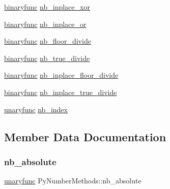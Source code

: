 \begin{DoxyCompactItemize}
\item 
\mbox{\hyperlink{_python27_2object_8h_a1a50b2d154f36acb9d215f2cdc1561a8}{binaryfunc}} \mbox{\hyperlink{struct_py_number_methods_a765b38e2d40ef62058dc8433fb35d2d8}{nb\+\_\+inplace\+\_\+xor}}
\item 
\mbox{\hyperlink{_python27_2object_8h_a1a50b2d154f36acb9d215f2cdc1561a8}{binaryfunc}} \mbox{\hyperlink{struct_py_number_methods_a3e01f63c2f42532862663e2d94f70833}{nb\+\_\+inplace\+\_\+or}}
\item 
\mbox{\hyperlink{_python27_2object_8h_a1a50b2d154f36acb9d215f2cdc1561a8}{binaryfunc}} \mbox{\hyperlink{struct_py_number_methods_a05f22c9ef56fb0c264dd1987975f6c0c}{nb\+\_\+floor\+\_\+divide}}
\item 
\mbox{\hyperlink{_python27_2object_8h_a1a50b2d154f36acb9d215f2cdc1561a8}{binaryfunc}} \mbox{\hyperlink{struct_py_number_methods_a7de1a2730c487e2dcce5babec5b24bed}{nb\+\_\+true\+\_\+divide}}
\item 
\mbox{\hyperlink{_python27_2object_8h_a1a50b2d154f36acb9d215f2cdc1561a8}{binaryfunc}} \mbox{\hyperlink{struct_py_number_methods_af12f77b35585ee95c1721216a3542d13}{nb\+\_\+inplace\+\_\+floor\+\_\+divide}}
\item 
\mbox{\hyperlink{_python27_2object_8h_a1a50b2d154f36acb9d215f2cdc1561a8}{binaryfunc}} \mbox{\hyperlink{struct_py_number_methods_a97f52131b7b10b1f37f7cbe1fe9835a3}{nb\+\_\+inplace\+\_\+true\+\_\+divide}}
\item 
\mbox{\hyperlink{_python27_2object_8h_aeda2d77a292fdf2c686151d24b3dbf5a}{unaryfunc}} \mbox{\hyperlink{struct_py_number_methods_ade4ff47ded0d8b356dfbca189fc35bc6}{nb\+\_\+index}}
\end{DoxyCompactItemize}


\subsection{Member Data Documentation}
\mbox{\label{struct_py_number_methods_aacd0b9091af25d0b001c7ae955f01242}} 
\subsubsection{\texorpdfstring{nb\_absolute}{nb\_absolute}}
{\footnotesize\ttfamily \mbox{\hyperlink{_python27_2object_8h_aeda2d77a292fdf2c686151d24b3dbf5a}{unaryfunc}} Py\+Number\+Methods\+::nb\+\_\+absolute}

